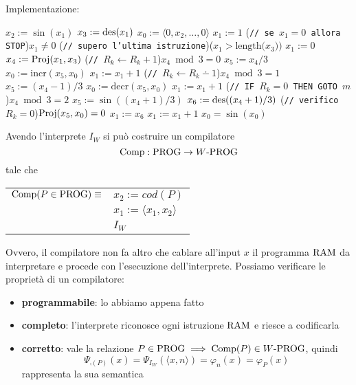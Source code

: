 Implementazione:
\begin{tcolorbox}[colback=white,sharp corners,boxrule=.3mm]
	\begin{algorithm}[H]
		\SetAlgoNoEnd
		$x_2 := \sin(x_1)$\;
		$x_3 := \operatorname{des}(x_1)$\;
		$x_0 := \langle 0,x_2,\dots,0 \rangle$\;
		$x_1 := 1$\;
		\While(\hfill\texttt{// se $x_1=0$ allora STOP}){$x_1\neq 0$}{
			\eIf(\hfill\texttt{// supero l'ultima istruzione}){($x_1>\text{length($x_3$))}$}{
				$x_1:=0$
			}{
				$x_4 := \text{Proj}(x_1,x_3)$
				\If(\hfill\texttt{// }$R_k\leftarrow R_k+1$){$x_4\bmod{3}=0$}{
					$x_5 := x_4 / 3$
					$x_0 := \text{incr}(x_5,x_0)$\;
					$x_1 := x_1+1$\;
				}
				\If(\hfill\texttt{// }$R_k\leftarrow R_k\dotminus1$){$x_4\bmod{3}=1$}{
					$x_5 := (x_4-1) / 3$
					$x_0 := \text{decr}(x_5,x_0)$\;
					$x_1 := x_1+1$\;
				}
				\If(\hfill\texttt{// IF $R_k=0$ THEN GOTO $m$}){$x_4\bmod{3}=2$}{
					$x_5 := \sin((x_4+1)/3)$
					$x_6 := \operatorname{des}((x_4+1)/3)$
					\eIf(\hfill\texttt{// verifico }$R_k=0$){$\text{Proj}(x_5,x_0)=0$}{
						$x_1:=x_6$\;
					}{
						$x_1:=x_1+1$\;
					}
				}
			}
		}
		$x_0 = \sin(x_0)$
	\end{algorithm}
\end{tcolorbox}

Avendo l'interprete $I_W$ si può costruire un compilatore
$$ \text{Comp}: \text{PROG} \rightarrow W\text{-PROG} $$
tale che 
\begin{center}
	\begin{tabular}{r|l|}
		\cline{2-2}
		$\text{Comp} (P \in \text{PROG}) \equiv$	& $x_2 := cod(P)$ \\
			& $x_1 := \langle x_1, x_2 \rangle$ \\
			& $I_W$ \\
		\cline{2-2}
	\end{tabular}
\end{center}

Ovvero, il compilatore non fa altro che cablare all'input $x$ il programma $\text{RAM}$ da interpretare e procede con l'esecuzione dell'interprete. Possiamo verificare le proprietà di un compilatore: 
\begin{itemize}
	\item \textbf{programmabile}: lo abbiamo appena fatto
	
    \item \textbf{completo}: l'interprete riconosce ogni istruzione $\text{RAM}$ e riesce a codificarla
	
    \item \textbf{corretto}: vale la relazione $P \in \text{PROG} \implies \text{Comp} (P) \in W\text{-PROG}$, quindi
	$$ \Psi_{\comp (P)} (x) = \Psi_{I_W} (\langle x,n \rangle) = \varphi_n (x) = \varphi_P (x) $$
	rappresenta la sua semantica
\end{itemize}

